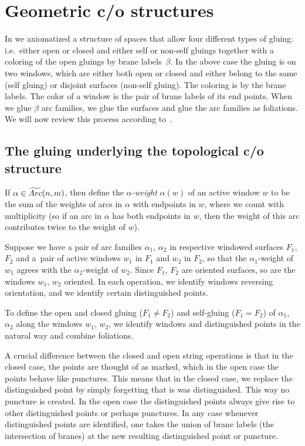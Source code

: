 \documentclass[11pt]{article}
\begin{document}
\setcounter{section}{2}
\setcounter{subsection}{4}
\setcounter{subsubsection}{1}
\setcounter{thm}{0}
\setcounter{equation}{0}
\section{Geometric c/o structures}
\label{geosection}

In \cite{KP} we axiomatized a structure of spaces that allow four dif\/ferent types of gluing: i.e.\
either open or closed and either self or non-self gluings together with a coloring of the open gluings by brane labels~$\beta$. In the above case the gluing is on two  windows, which are either both
open or closed and either belong to the same (self gluing) or disjoint surfaces (non-self gluing).
The coloring is by the brane labels. The color of a window is the pair of brane labels of its
end points. When we glue $\beta$ arc families, we glue the surfaces and
glue the arc families as foliations. We will now review this process according to~\cite{KP}.


\subsection{The gluing underlying the topological c/o structure}




If $\alpha\in\widetilde{\rm Arc} (n,m)$, then def\/ine the {\it $\alpha$-weight} $\alpha(w)$ of an active window $w$ to be the sum
of
the weights of arcs in $\alpha$ with endpoints in $w$, where we count with multiplicity
(so if an arc in $\alpha$ has both endpoints in $w$, then the weight of this arc contributes twice to the weight of
$w$).

Suppose we have a pair of arc families $\alpha_1$, $\alpha _2$
in respective windowed surfaces $F_1$, $F_2$ and a~pair of active windows $w_1$ in $F_1$ and $w_2$ in $F_2$, so that the
$\alpha _1$-weight of $w_1$ agrees with the $\alpha _2$-weight of $w_2$.
Since $F_1$, $F_2$ are oriented surfaces, so are the windows $w_1$, $w_2$ oriented.   In each operation, we
identify windows reversing orientation, and we identify certain distinguished points.

To def\/ine the open and closed gluing ($F_1\neq F_2$) and self-gluing ($F_1=F_2$) of $\alpha_1$, $\alpha _2$ along the
windows
$w_1$, $w_2$, we
identify windows and distinguished points in the natural way and combine foliations.

A crucial dif\/ference  between the closed and open string operations is that in the closed case,
the points are thought of as marked, which in the open case the points behave like punctures.
This means that in the closed case, we
replace the  distinguished point by simply forgetting that is was distinguished. This way  no puncture is created. In the open case the distinguished
points
always give rise to other distinguished points or perhaps punctures.
 In any case whenever distinguished points are
identif\/ied, one takes the union of brane labels (the intersection of branes) at the new resulting distinguished point or puncture.
\end{document}
